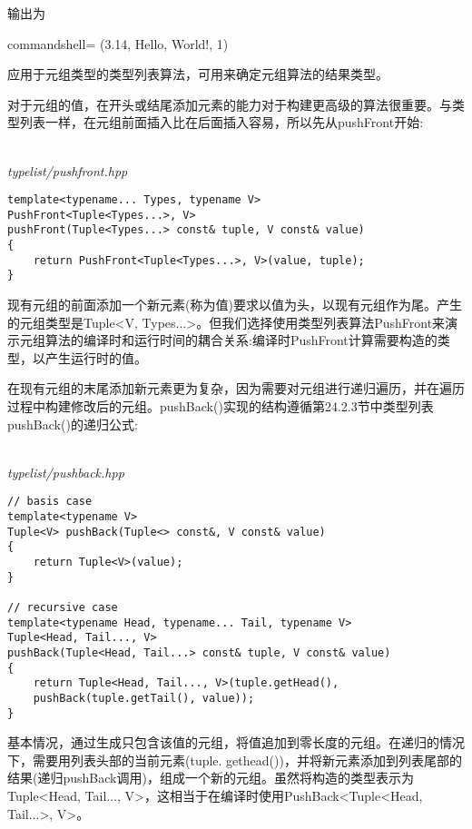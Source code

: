 输出为

\begin{tcblisting}{commandshell={}}
(3.14, Hello, World!, 1)
\end{tcblisting}

应用于元组类型的类型列表算法，可用来确定元组算法的结果类型。


对于元组的值，在开头或结尾添加元素的能力对于构建更高级的算法很重要。与类型列表一样，在元组前面插入比在后面插入容易，所以先从pushFront开始:

\hspace*{\fill} \\ %
\noindent
\textit{typelist/pushfront.hpp}
\begin{lstlisting}[style=styleCXX]
template<typename... Types, typename V>
PushFront<Tuple<Types...>, V>
pushFront(Tuple<Types...> const& tuple, V const& value)
{
	return PushFront<Tuple<Types...>, V>(value, tuple);
}
\end{lstlisting}

现有元组的前面添加一个新元素(称为值)要求以值为头，以现有元组作为尾。产生的元组类型是Tuple<V, Types...>。但我们选择使用类型列表算法PushFront来演示元组算法的编译时和运行时间的耦合关系:编译时PushFront计算需要构造的类型，以产生运行时的值。

在现有元组的末尾添加新元素更为复杂，因为需要对元组进行递归遍历，并在遍历过程中构建修改后的元组。pushBack()实现的结构遵循第24.2.3节中类型列表pushBack()的递归公式:

\hspace*{\fill} \\ %
\noindent
\textit{typelist/pushback.hpp}
\begin{lstlisting}[style=styleCXX]
// basis case
template<typename V>
Tuple<V> pushBack(Tuple<> const&, V const& value)
{
	return Tuple<V>(value);
}

// recursive case
template<typename Head, typename... Tail, typename V>
Tuple<Head, Tail..., V>
pushBack(Tuple<Head, Tail...> const& tuple, V const& value)
{
	return Tuple<Head, Tail..., V>(tuple.getHead(),
	pushBack(tuple.getTail(), value));
}
\end{lstlisting}

基本情况，通过生成只包含该值的元组，将值追加到零长度的元组。在递归的情况下，需要用列表头部的当前元素(tuple. gethead())，并将新元素添加到列表尾部的结果(递归pushBack调用)，组成一个新的元组。虽然将构造的类型表示为Tuple<Head, Tail..., V>，这相当于在编译时使用PushBack<Tuple<Head, Tail...>, V>。

